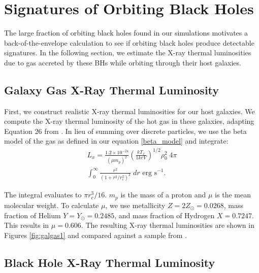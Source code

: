 \documentclass[fleqn,usenatbib,useAMS]{mnras}
\begin{document}
\section{Signatures of Orbiting Black Holes}
The large fraction of orbiting black holes found in our simulations motivates a back-of-the-envelope calculation to see if orbiting black holes produce detectable signatures. In the following section, we estimate the X-ray thermal luminosities due to gas accreted by these BHs while orbiting through their host galaxies.

\subsection{Galaxy Gas X-Ray Thermal Luminosity}
First, we construct realistic X-ray thermal luminosities for our host galaxies. We compute the X-ray thermal luminosity of the hot gas in these galaxies, adapting Equation 26 from \citet{2012ApJ...754..125C}. In lieu of summing over discrete particles, we use the beta model of the gas as defined in our equation \ref{beta_model} and integrate:
\begin{equation}
\begin{aligned}
    L_x ={} \frac{1.2 \times 10^{-24}}{(\mu m_p)^2}\left(\frac{kT_x}{1keV}\right)^{1/2}\rho_0^{2}\;4{\pi} \\
    \int_{0}^{\infty}\frac{r^2}{(1+r^2/r_c^2)^{3}}\;dr\text{  erg s}^{-1}.
\end{aligned}
\end{equation}

The integral evaluates to ${\pi}r_c^3/16$.  $m_p$ is the mass of a proton and $\mu$ is the mean molecular weight.  To calculate $\mu$, we use metallicity $Z=2Z_{\odot}=0.0268$, mass fraction of Helium $Y=Y_{\odot}=0.2485$, and mass fraction of Hydrogen $X=0.7247$.  This results in $\mu=0.606$. The resulting X-ray thermal luminosities are shown in Figures \ref{fig:galgas1} and compared against a sample from \citet{2018ApJ...857...32B}.

\subsection{Black Hole X-Ray Thermal Luminosity}
\end{document}
